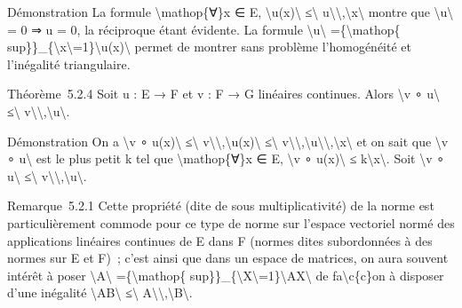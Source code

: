 \documentclass[]{article}
\begin{document}
Démonstration La formule \textbackslash{}mathop\{∀\}x ∈ E,
\textbackslash{}\textbar{}u(x)\textbackslash{}\textbar{}
≤\textbackslash{}\textbar{}
u\textbackslash{}\textbar{}\textbackslash{},\textbackslash{}\textbar{}x\textbackslash{}\textbar{}
montre que \textbackslash{}\textbar{}u\textbackslash{}\textbar{} = 0 ⇒ u
= 0, la réciproque étant évidente. La formule
\textbackslash{}\textbar{}u\textbackslash{}\textbar{}
=\{\textbackslash{}mathop\{
sup\}\}\_\{\textbackslash{}\textbar{}x\textbackslash{}\textbar{}=1\}\textbackslash{}\textbar{}u(x)\textbackslash{}\textbar{}
permet de montrer sans problème l'homogénéité et l'inégalité
triangulaire.

Théorème~5.2.4 Soit u : E → F et v : F → G linéaires continues. Alors
\textbackslash{}\textbar{}v ∘ u\textbackslash{}\textbar{}
≤\textbackslash{}\textbar{}
v\textbackslash{}\textbar{}\textbackslash{},\textbackslash{}\textbar{}u\textbackslash{}\textbar{}.

Démonstration On a \textbackslash{}\textbar{}v ∘
u(x)\textbackslash{}\textbar{} ≤\textbackslash{}\textbar{}
v\textbackslash{}\textbar{}\textbackslash{},\textbackslash{}\textbar{}u(x)\textbackslash{}\textbar{}
≤\textbackslash{}\textbar{}
v\textbackslash{}\textbar{}\textbackslash{},\textbackslash{}\textbar{}u\textbackslash{}\textbar{}\textbackslash{},\textbackslash{}\textbar{}x\textbackslash{}\textbar{}
et on sait que \textbackslash{}\textbar{}v ∘ u\textbackslash{}\textbar{}
est le plus petit k tel que \textbackslash{}mathop\{∀\}x ∈ E,
\textbackslash{}\textbar{}v ∘ u(x)\textbackslash{}\textbar{} ≤
k\textbackslash{}\textbar{}x\textbackslash{}\textbar{}. Soit
\textbackslash{}\textbar{}v ∘ u\textbackslash{}\textbar{}
≤\textbackslash{}\textbar{}
v\textbackslash{}\textbar{}\textbackslash{},\textbackslash{}\textbar{}u\textbackslash{}\textbar{}.

Remarque~5.2.1 Cette propriété (dite de sous multiplicativité) de la
norme est particulièrement commode pour ce type de norme sur l'espace
vectoriel normé des applications linéaires continues de E dans F (normes
dites subordonnées à des normes sur E et F)~; c'est ainsi que dans un
espace de matrices, on aura souvent intérêt à poser
\textbackslash{}\textbar{}A\textbackslash{}\textbar{}
=\{\textbackslash{}mathop\{
sup\}\}\_\{\textbackslash{}\textbar{}X\textbackslash{}\textbar{}=1\}\textbackslash{}\textbar{}AX\textbackslash{}\textbar{}
de fa\textbackslash{}c\{c\}on à disposer d'une inégalité
\textbackslash{}\textbar{}AB\textbackslash{}\textbar{}
≤\textbackslash{}\textbar{}
A\textbackslash{}\textbar{}\textbackslash{},\textbackslash{}\textbar{}B\textbackslash{}\textbar{}.
\end{document}
